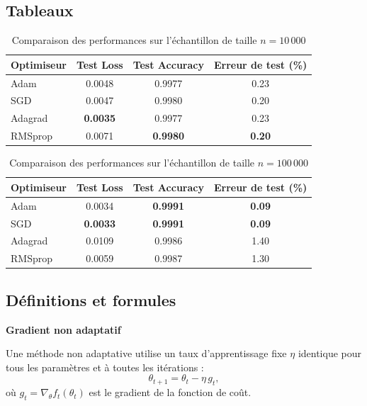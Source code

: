 \documentclass[a4paper,12pt]{article}
\begin{document}
\subsection{Tableaux}

\begin{table}[H]
\centering
\begin{tabular}{|l|c|c|c|}
\hline
\rowcolor{lightgray}
\textbf{Optimiseur} & \textbf{Test Loss} & \textbf{Test Accuracy} & \textbf{Erreur de test (\%)} \\
\hline
Adam      & 0.0048 & 0.9977 & 0.23 \\
\hline
SGD       & 0.0047 & 0.9980 & 0.20 \\
\hline
\rowcolor{lightgray!50}
Adagrad   & \textbf{0.0035} & 0.9977 & 0.23 \\
\hline
RMSprop   & 0.0071 & \textbf{0.9980} & \textbf{0.20} \\
\hline
\end{tabular}
\caption{Comparaison des performances sur l'échantillon de taille $n=10\,000$}
\label{tab:results_10k}
\end{table}

\begin{table}[H]
\centering
\begin{tabular}{|l|c|c|c|}
\hline
\rowcolor{lightgray}
\textbf{Optimiseur} & \textbf{Test Loss} & \textbf{Test Accuracy} & \textbf{Erreur de test (\%)} \\
\hline
\rowcolor{lightgray!50}
Adam      & 0.0034 & \textbf{0.9991} & \textbf{0.09} \\
\hline
\rowcolor{lightgray!50}
SGD       & \textbf{0.0033} & \textbf{0.9991} & \textbf{0.09} \\
\hline
Adagrad   & 0.0109 & 0.9986 & 1.40 \\
\hline
RMSprop   & 0.0059 & 0.9987 & 1.30 \\
\hline
\end{tabular}
\caption{Comparaison des performances sur l'échantillon de taille $n=100\,000$}
\label{tab:results_100k}
\end{table}

\subsection{Définitions et formules}

\noindent\textbf{Gradient non adaptatif}\\
\par Une méthode non adaptative utilise un taux d'apprentissage fixe $\eta$ identique pour tous les paramètres
et à toutes les itérations :
\[
\theta_{t+1} = \theta_t - \eta \, g_t,
\]
où $g_t = \nabla_\theta f_t(\theta_t)$ est le gradient de la fonction de coût.\\
\end{document}
